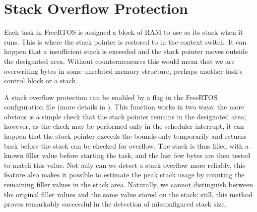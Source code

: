 \section{Stack Overflow Protection}

Each task in FreeRTOS is assigned a block of \gls{RAM} to use as its stack when it runs. This is where the stack pointer is restored to in the context switch. It can happen that a insufficient stack is exceeded and the stack pointer moves outside the designated area. Without countermeasures this would mean that we are overwriting bytes in some unrelated memory structure, perhaps another task's control block or a stack.

A stack overflow protection can be enabled by a flag in the FreeRTOS configuration file (more details in \cite{freertos-stackov}). This function works in two ways: the more obvious is a simple check that the stack pointer remains in the designated area; however, as the check may be performed only in the scheduler interrupt, it can happen that the stack pointer exceeds the bounds only temporarily and returns back before the stack can be checked for overflow. The stack is thus filled with a known filler value before starting the task, and the last few bytes are then tested to match this value. Not only can we detect a stack overflow more reliably, this feature also makes it possible to estimate the peak stack usage by counting the remaining filler values in the stack area. Naturally, we cannot distinguish between the original filler values and the same value stored on the stack; still, this method proves remarkably successful in the detection of misconfigured stack size.

